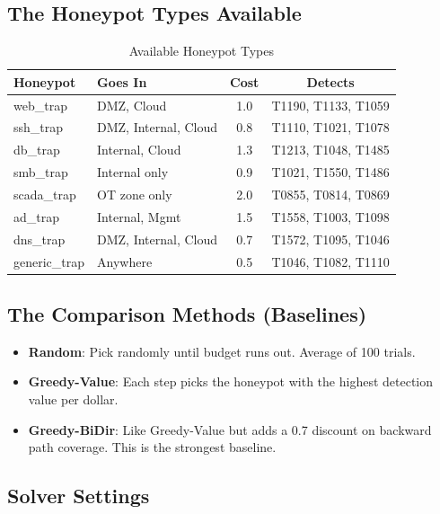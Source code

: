 \documentclass[journal]{IEEEtran}
\begin{document}
\subsection{The Honeypot Types Available}

\begin{table}[htbp]
\caption{Available Honeypot Types}
\label{tab:profiles}
\centering
\renewcommand{\arraystretch}{1.2}
\begin{tabular}{@{}llcc@{}}
\toprule
\textbf{Honeypot} & \textbf{Goes In} & \textbf{Cost} &
\textbf{Detects} \\
\midrule
web\_trap     & DMZ, Cloud          & 1.0 & T1190, T1133, T1059 \\
ssh\_trap     & DMZ, Internal, Cloud& 0.8 & T1110, T1021, T1078 \\
db\_trap      & Internal, Cloud     & 1.3 & T1213, T1048, T1485 \\
smb\_trap     & Internal only       & 0.9 & T1021, T1550, T1486 \\
scada\_trap   & OT zone only        & 2.0 & T0855, T0814, T0869 \\
ad\_trap      & Internal, Mgmt      & 1.5 & T1558, T1003, T1098 \\
dns\_trap     & DMZ, Internal, Cloud& 0.7 & T1572, T1095, T1046 \\
generic\_trap & Anywhere            & 0.5 & T1046, T1082, T1110 \\
\bottomrule
\end{tabular}
\end{table}

\subsection{The Comparison Methods (Baselines)}

\begin{itemize}
  \item \textbf{Random}: Pick randomly until budget runs out.
        Average of 100 trials.
  \item \textbf{Greedy-Value}: Each step picks the honeypot
        with the highest detection value per dollar.
  \item \textbf{Greedy-BiDir}: Like Greedy-Value but adds
        a 0.7 discount on backward path coverage.
        This is the strongest baseline.
\end{itemize}

\subsection{Solver Settings}
\end{document}
